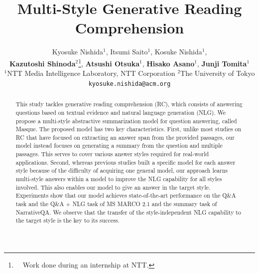 \documentclass[11pt,a4paper]{article}
\theoremstyle{mydef}
\theoremstyle{myprob}
\begin{document}
\newcommand\BibTeX{B{\sc ib}\TeX}

\title{Multi-Style Generative Reading Comprehension}

\author{Kyosuke Nishida$^1$, 
Itsumi Saito$^1$, 
Kosuke Nishida$^1$, 
\\{\bf Kazutoshi Shinoda}$^2$\thanks{\ \ Work done during an internship at NTT.}, 
{\bf Atsushi Otsuka}$^1$,
{\bf Hisako Asano}$^1$, 
{\bf Junji Tomita}$^1$\\
  $^1$NTT Media Intelligence Laboratory, NTT Corporation \hspace{1.5em}  $^2$The University of Tokyo\\
  {\tt kyosuke.nishida@acm.org}
}

\date{}


\maketitle

\begin{abstract}
This study tackles generative reading comprehension (RC), which consists of answering questions based on textual evidence and natural language generation (NLG).
We propose a multi-style abstractive summarization model for question answering, called Masque.
The proposed model has two key characteristics.
First, unlike most studies on RC that have focused on extracting an answer span from the provided passages, our model instead focuses on generating a summary from the question and multiple passages.
This serves to cover various answer styles required for real-world applications. 
Second, 
whereas previous studies built 
a specific model for each answer style because of the difficulty of acquiring one general model,
our approach learns multi-style answers within a model to improve the NLG capability for all styles involved.
This also enables our model to 
give an answer in the target style.
Experiments show that our model achieves state-of-the-art performance on 
the Q\&A task and the Q\&A + NLG task 
of MS MARCO 2.1 and the summary task of NarrativeQA. 
We observe that the transfer of the style-independent NLG capability to the target style is the key to its success.
\end{abstract}
\end{document}
